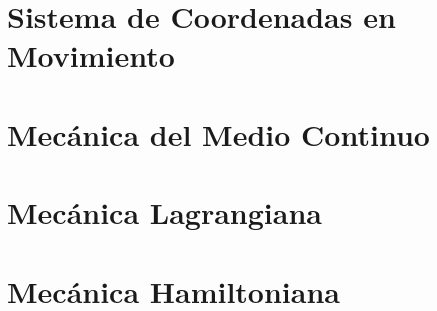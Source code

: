 \chapter{Sistema de Coordenadas en Movimiento}















\chapter{Mecánica del Medio Continuo}















\chapter{Mecánica Lagrangiana}
















\chapter{Mecánica Hamiltoniana}



















